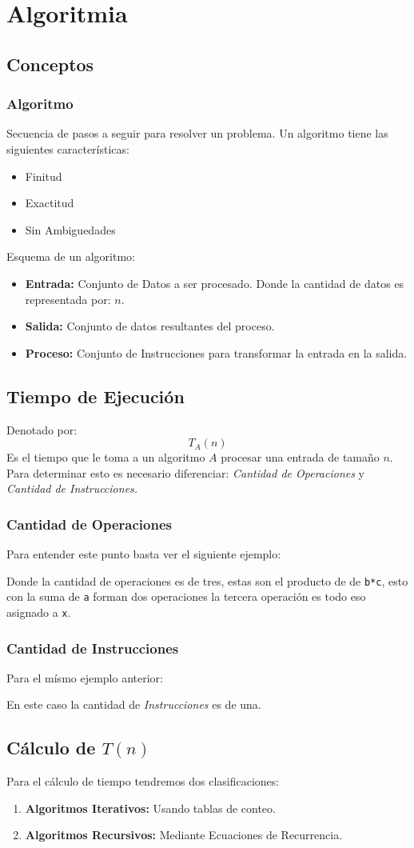 \section{Algoritmia}
\subsection{Conceptos}
\subsubsection{Algoritmo}
Secuencia de pasos a seguir para resolver un problema. Un algoritmo tiene las siguientes características:
\begin{itemize}
\item Finitud
\item Exactitud
\item Sin Ambiguedades
\end{itemize}
Esquema de un algoritmo:
\begin{itemize}
\item \textbf{Entrada:} Conjunto de Datos a ser procesado. Donde la cantidad de datos es representada por: $n$.
\item \textbf{Salida:} Conjunto de datos resultantes del proceso.
\item \textbf{Proceso:} Conjunto de Instrucciones para transformar la entrada en la salida.
\end{itemize}
\subsection{Tiempo de Ejecución}
Denotado por:
$$T_A(n)$$
Es el tiempo que le toma a un algoritmo $A$ procesar una entrada de tamaño $n$. Para determinar esto es necesario diferenciar: \textit{Cantidad de Operaciones} y \textit{Cantidad de Instrucciones.}
\subsubsection{Cantidad de Operaciones}
Para entender este punto basta ver el siguiente ejemplo:

Donde la cantidad de operaciones es de tres, estas son el producto de de \texttt{b*c}, esto con la suma de \texttt{a} forman dos operaciones la tercera operación es todo eso asignado a \texttt{x}.
\subsubsection{Cantidad de Instrucciones}
Para el mísmo ejemplo anterior:

En este caso la cantidad de \textit{Instrucciones} es de una.
\subsection{Cálculo de $T(n)$}
Para el cálculo de tiempo tendremos dos clasificaciones:
\begin{enumerate}
\item \textbf{Algoritmos Iterativos:} Usando tablas de conteo.
\item \textbf{Algoritmos Recursivos:} Mediante Ecuaciones de Recurrencia.
\end{enumerate}